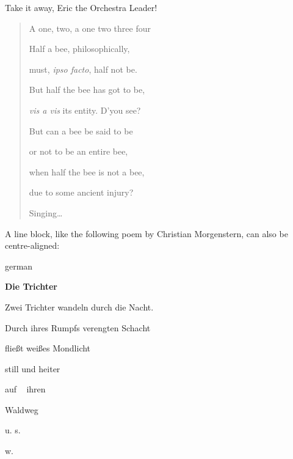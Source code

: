 \documentclass[a4paper]{article}
\begin{document}
Take it away, Eric the Orchestra Leader!

\begin{quote}
\begin{DUlineblock}{0em}
\item[] A one, two, a one two three four
\item[] 
\item[] Half a bee, philosophically,
\item[]
\begin{DUlineblock}{\DUlineblockindent}
\item[] must, \emph{ipso facto}, half not be.
\end{DUlineblock}
\item[] But half the bee has got to be,
\item[]
\begin{DUlineblock}{\DUlineblockindent}
\item[] \emph{vis a vis} its entity.  D’you see?
\item[] 
\end{DUlineblock}
\item[] But can a bee be said to be
\item[]
\begin{DUlineblock}{\DUlineblockindent}
\item[] or not to be an entire bee,
\item[]
\begin{DUlineblock}{\DUlineblockindent}
\item[] when half the bee is not a bee,
\item[]
\begin{DUlineblock}{\DUlineblockindent}
\item[] due to some ancient injury?
\item[] 
\end{DUlineblock}
\end{DUlineblock}
\end{DUlineblock}
\item[] Singing…
\end{DUlineblock}
\end{quote}

A line block, like the following poem by Christian Morgenstern, can
also be centre-aligned:

\begin{selectlanguage}{german}
\begin{DUlineblock}{0em}
\centering
\item[] \textbf{Die Trichter}
\item[] 
\item[] Zwei Trichter wandeln durch die Nacht.
\item[] Durch ihres Rumpfs verengten Schacht
\item[] fließt weißes Mondlicht
\item[] still und heiter
\item[] auf   ihren
\item[] Waldweg
\item[] u. s.
\item[] w.
\item[] 
\end{DUlineblock}
\end{selectlanguage}
\end{document}
